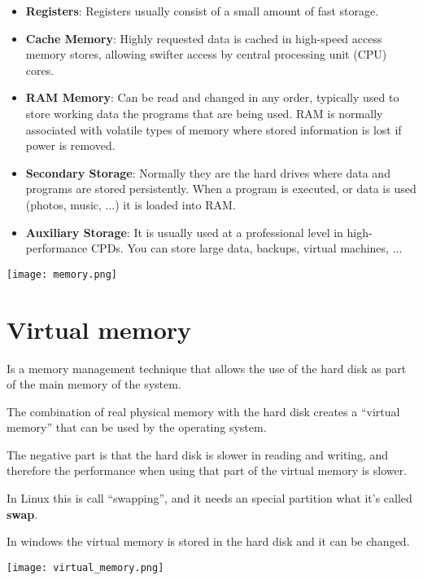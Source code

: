 \begin{itemize}
    \item \textbf{Registers}: Registers usually consist of a small amount of fast storage.
    \item \textbf{Cache Memory}: Highly requested data is cached in high-speed access memory stores, allowing swifter access by central processing unit (CPU) cores.

    \item \textbf{RAM Memory}: Can be read and changed in any order, typically used to store working data the programs that are being used. RAM is normally associated with volatile types of memory where stored information is lost if power is removed.

    \item \textbf{Secondary Storage}: Normally they are the hard drives where data and programs are stored persistently. When a program is executed, or data is used (photos, music, ...) it is loaded into RAM.

    \item \textbf{Auxiliary Storage}: It is usually used at a professional level in high-performance CPDs. You can store large data, backups, virtual machines, ...
\end{itemize}

\begin{center}
    \texttt{[image: memory.png]}
    \vspace{-8pt}
    \vspace{-13pt}
\end{center}


\section{Virtual memory}
\begin{minipage}{0.7\linewidth}
    Is a memory management technique that allows the use of the hard disk as part of the main memory of the system.

    The combination of real physical memory with the hard disk creates a “virtual memory” that can be used by the operating system.

    The negative part is that the hard disk is slower in reading and writing, and therefore the performance when using that part of the virtual memory is slower.

    In Linux this is call “swapping”, and it needs an special partition what it's called \textbf{swap}.

    In windows the virtual memory is stored in the hard disk and it can be changed.
\end{minipage}
\hfill
\begin{minipage}{0.25\linewidth}
    \texttt{[image: virtual\_memory.png]}
    \vspace{-10pt}
\end{minipage}

